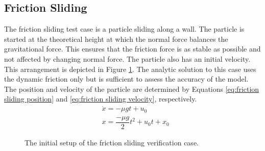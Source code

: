 \documentclass[a4paper,11pt,titlepage]{report}
\begin{document}
\subsection{Friction Sliding}
\label{sec:friction sliding verification}
The friction sliding test case is a particle sliding along a wall. The particle is started at the theoretical height at which the normal force balances the gravitational force. This ensures that the friction force is as stable as possible and not affected by changing normal force. The particle also has an initial velocity. This arrangement is depicted in Figure \ref{fig:friction sliding}.
The analytic solution to this case uses the dynamic friction only but is sufficient to assess the accuracy of the model. The position and velocity of the particle are determined by Equations \ref{eq:friction sliding position} and \ref{eq:friction sliding velocity}, respectively.
\begin{align}
&\dot{x} = - \mu g t + u_0 \label{eq:friction sliding velocity} \\
&x = \dfrac{- \mu g}{2}t^2 + u_0 t + x_0 \label{eq:friction sliding position}
\end{align}
\begin{figure}[!ht]
\centering

\caption{The initial setup of the friction sliding verification case.}
\label{fig:friction sliding}
\end{figure}
\end{document}
